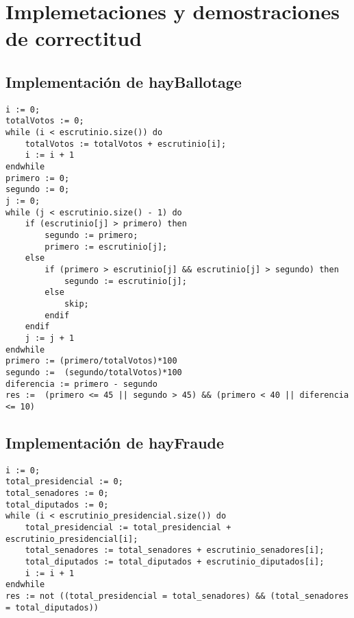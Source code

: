\documentclass[10pt,a4paper]{article}
\begin{document}

\newpage

\section{Implemetaciones y demostraciones de correctitud}

\subsection{Implementación de hayBallotage}

	\begin{lstlisting}[caption={},label=code:for]
i := 0;
totalVotos := 0;
while (i < escrutinio.size()) do
	totalVotos := totalVotos + escrutinio[i];
	i := i + 1
endwhile
primero := 0;
segundo := 0;
j := 0;
while (j < escrutinio.size() - 1) do
	if (escrutinio[j] > primero) then
		segundo := primero;
		primero := escrutinio[j];
	else
		if (primero > escrutinio[j] && escrutinio[j] > segundo) then
			segundo := escrutinio[j];
		else
			skip;
		endif
	endif
	j := j + 1
endwhile
primero := (primero/totalVotos)*100
segundo :=  (segundo/totalVotos)*100
diferencia := primero - segundo
res :=  (primero <= 45 || segundo > 45) && (primero < 40 || diferencia <= 10) 
	\end{lstlisting}

\subsection{Implementación de hayFraude}

	\begin{lstlisting}[caption={},label=code:for]
i := 0;
total_presidencial := 0;
total_senadores := 0;
total_diputados := 0;
while (i < escrutinio_presidencial.size()) do
	total_presidencial := total_presidencial + escrutinio_presidencial[i];
	total_senadores := total_senadores + escrutinio_senadores[i];
	total_diputados := total_diputados + escrutinio_diputados[i];
	i := i + 1
endwhile
res := not ((total_presidencial = total_senadores) && (total_senadores = total_diputados))
	\end{lstlisting}
\end{document}
